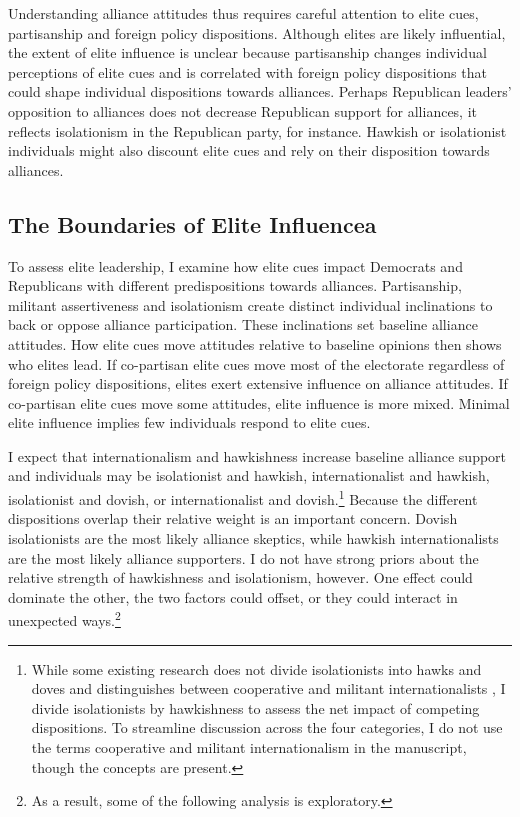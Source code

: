 \documentclass[12pt]{article}
\begin{document}
Understanding alliance attitudes thus requires careful attention to elite cues, partisanship and foreign policy dispositions. 
Although elites are likely influential, the extent of elite influence is unclear because partisanship changes individual perceptions of elite cues and is correlated with foreign policy dispositions that could shape individual dispositions towards alliances. 
Perhaps Republican leaders' opposition to alliances does not decrease Republican support for alliances, it reflects isolationism in the Republican party, for instance. 
Hawkish or isolationist individuals might also discount elite cues and rely on their disposition towards alliances. 



\subsection{The Boundaries of Elite Influencea}


To assess elite leadership, I examine how elite cues impact Democrats and Republicans with different predispositions towards alliances.
Partisanship, militant assertiveness and isolationism create distinct individual inclinations to back or oppose alliance participation. 
These inclinations set baseline alliance attitudes. 
How elite cues move attitudes relative to baseline opinions then shows who elites lead. 
If co-partisan elite cues move most of the electorate regardless of foreign policy dispositions, elites exert extensive influence on alliance attitudes. 
If co-partisan elite cues move some attitudes, elite influence is more mixed. 
Minimal elite influence implies few individuals respond to elite cues. 


I expect that internationalism and hawkishness increase baseline alliance support and individuals may be isolationist and hawkish, internationalist and hawkish, isolationist and dovish, or internationalist and dovish.\footnote{While some existing research does not divide isolationists into hawks and doves and distinguishes between cooperative and militant internationalists \citep{Kertzeretal2014}, I divide isolationists by hawkishness to assess the net impact of competing dispositions. To streamline discussion across the four categories, I do not use the terms cooperative and militant internationalism in the manuscript, though the concepts are present.}  
Because the different dispositions overlap their relative weight is an important concern.
Dovish isolationists are the most likely alliance skeptics, while hawkish internationalists are the most likely alliance supporters. 
I do not have strong priors about the relative strength of hawkishness and isolationism, however.
One effect could dominate the other, the two factors could offset, or they could interact in unexpected ways.\footnote{As a result, some of the following analysis is exploratory.}
\end{document}
